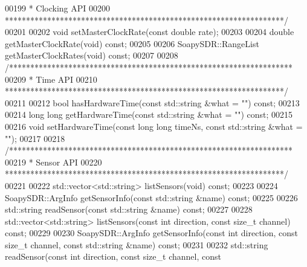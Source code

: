 \begin{DoxyCode}
00199 \textcolor{comment}{     * Clocking API}
00200 \textcolor{comment}{     ******************************************************************/}
00201 
00202     \textcolor{keywordtype}{void} setMasterClockRate(\textcolor{keyword}{const} \textcolor{keywordtype}{double} rate);
00203 
00204     \textcolor{keywordtype}{double} getMasterClockRate(\textcolor{keywordtype}{void}) \textcolor{keyword}{const};
00205 
00206     SoapySDR::RangeList getMasterClockRates(\textcolor{keywordtype}{void}) \textcolor{keyword}{const};
00207 
00208     \textcolor{comment}{/*******************************************************************}
00209 \textcolor{comment}{     * Time API}
00210 \textcolor{comment}{     ******************************************************************/}
00211 
00212     \textcolor{keywordtype}{bool} hasHardwareTime(\textcolor{keyword}{const} std::string &what = \textcolor{stringliteral}{""}) \textcolor{keyword}{const};
00213 
00214     \textcolor{keywordtype}{long} \textcolor{keywordtype}{long} getHardwareTime(\textcolor{keyword}{const} std::string &what = \textcolor{stringliteral}{""}) \textcolor{keyword}{const};
00215 
00216     \textcolor{keywordtype}{void} setHardwareTime(\textcolor{keyword}{const} \textcolor{keywordtype}{long} \textcolor{keywordtype}{long} timeNs, \textcolor{keyword}{const} std::string &what = \textcolor{stringliteral}{""});
00217 
00218     \textcolor{comment}{/*******************************************************************}
00219 \textcolor{comment}{     * Sensor API}
00220 \textcolor{comment}{     ******************************************************************/}
00221 
00222     std::vector<std::string> listSensors(\textcolor{keywordtype}{void}) \textcolor{keyword}{const};
00223 
00224     SoapySDR::ArgInfo getSensorInfo(\textcolor{keyword}{const} std::string &name) \textcolor{keyword}{const};
00225 
00226     std::string readSensor(\textcolor{keyword}{const} std::string &name) \textcolor{keyword}{const};
00227 
00228     std::vector<std::string> listSensors(\textcolor{keyword}{const} \textcolor{keywordtype}{int} direction, \textcolor{keyword}{const} \textcolor{keywordtype}{size\_t} channel) \textcolor{keyword}{const};
00229 
00230     SoapySDR::ArgInfo getSensorInfo(\textcolor{keyword}{const} \textcolor{keywordtype}{int} direction, \textcolor{keyword}{const} \textcolor{keywordtype}{size\_t} channel, \textcolor{keyword}{const} 
      std::string &name) \textcolor{keyword}{const};
00231 
00232     std::string readSensor(\textcolor{keyword}{const} \textcolor{keywordtype}{int} direction, \textcolor{keyword}{const} \textcolor{keywordtype}{size\_t} channel, \textcolor{keyword}{const} 

\end{DoxyCode}
